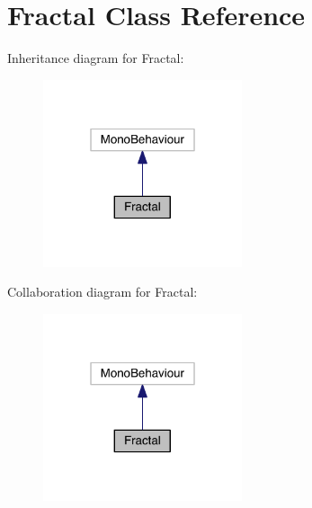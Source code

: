 \hypertarget{class_fractal}{}\section{Fractal Class Reference}
\label{class_fractal}


Inheritance diagram for Fractal\+:\nopagebreak
\begin{figure}[H]
\begin{center}
\leavevmode
\includegraphics[width=166pt]{class_fractal__inherit__graph}
\end{center}
\end{figure}


Collaboration diagram for Fractal\+:\nopagebreak
\begin{figure}[H]
\begin{center}
\leavevmode
\includegraphics[width=166pt]{class_fractal__coll__graph}
\end{center}
\end{figure}
